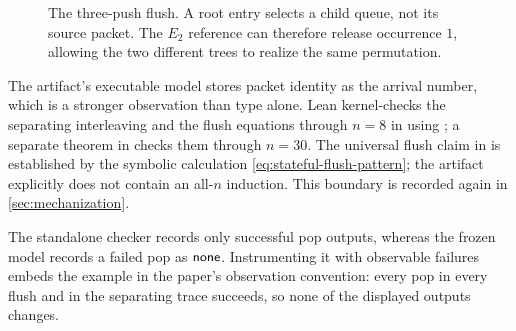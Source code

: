 \begin{figure}[t]
\centering
{}
\caption{The three-push flush.  A root entry selects a child queue, not its
source packet.  The \(E_2\) reference can therefore release occurrence \(1\),
allowing the two different trees to realize the same permutation.}
\label{fig:counterexample-hijack}
\end{figure}

The artifact's executable model stores packet identity as the arrival number,
which is a stronger observation than type alone.  Lean kernel-checks the
separating interleaving and the flush equations through \(n=8\) in
 using ; a separate 
theorem in  checks them through \(n=30\).  The universal
flush claim in
 is established by the symbolic calculation
\autoref{eq:stateful-flush-pattern}; the artifact explicitly does not contain an
all-\(n\) induction.  This boundary is recorded again in
\autoref{sec:mechanization}.

The standalone checker records only successful pop outputs, whereas the frozen
model records a failed pop as \(\mathsf{none}\).  Instrumenting it with observable
failures embeds the example in the paper's observation convention: every pop
in every flush and in the separating trace succeeds, so none of the displayed
outputs changes.
